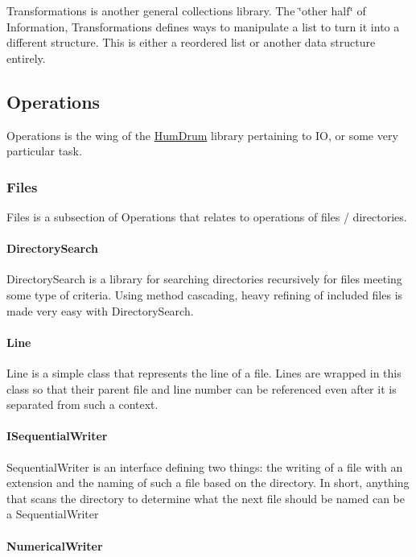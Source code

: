 Transformations is another general collections library. The \char`\"{}other half\char`\"{} of Information, Transformations defines ways to manipulate a list to turn it into a different structure. This is either a reordered list or another data structure entirely.

\subsection*{Operations}

Operations is the wing of the \hyperlink{namespaceHumDrum}{Hum\+Drum} library pertaining to I\+O, or some very particular task.

\subsubsection*{Files}

Files is a subsection of Operations that relates to operations of files / directories.

\paragraph*{Directory\+Search}

Directory\+Search is a library for searching directories recursively for files meeting some type of criteria. Using method cascading, heavy refining of included files is made very easy with Directory\+Search.

\paragraph*{Line}

Line is a simple class that represents the line of a file. Lines are wrapped in this class so that their parent file and line number can be referenced even after it is separated from such a context.

\paragraph*{I\+Sequential\+Writer}

Sequential\+Writer is an interface defining two things\+: the writing of a file with an extension and the naming of such a file based on the directory. In short, anything that scans the directory to determine what the next file should be named can be a Sequential\+Writer

\paragraph*{Numerical\+Writer}

